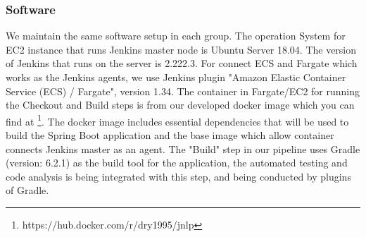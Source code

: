 \subsubsection{Software}
We maintain the same software setup in each group. The operation System for EC2 instance that runs Jenkins master node is Ubuntu Server 18.04. The version of Jenkins that runs on the server is 2.222.3. For connect ECS and Fargate which works as the Jenkins agents, we use Jenkins plugin "Amazon Elastic Container Service (ECS) / Fargate", version 1.34. The container in Fargate/EC2 for running the Checkout and Build steps is from our developed docker image which you can find at \footnote{https://hub.docker.com/r/dry1995/jnlp}. The docker image includes essential dependencies that will be used to build the Spring Boot application and the base image which allow container connects Jenkins master as an agent. The "Build" step in our pipeline uses Gradle (version: 6.2.1) as the build tool for the application, the automated testing and code analysis is being integrated with this step, and being conducted by plugins of Gradle.
